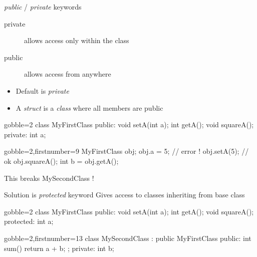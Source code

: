 \begin{frame}[fragile]
  \begin{block}{{\it public} \color{white} / {\it private} keywords}
    \begin{description}
      \item[private] allows access only within the class
      \item[public] allows access from anywhere
    \end{description}
    \begin{itemize}
      \item Default is {\it private}
      \item A {\it struct} is a {\it class} where all members are public
    \end{itemize}
  \end{block}
  \pause
  \begin{multicols}{2}
    \begin{cppcode*}{gobble=2}
      class MyFirstClass {
      public:
        void setA(int a);
        int getA();
        void squareA();
      private:
        int a;
      }
    \end{cppcode*}
    \columnbreak
    \begin{cppcode*}{gobble=2,firstnumber=9}
      MyFirstClass obj;
      obj.a = 5;   // error !
      obj.setA(5); // ok
      obj.squareA();
      int b = obj.getA();
    \end{cppcode*}
    \pause
    \begin{tcolorbox}[left=0mm,right=0mm,top=0mm,bottom=0mm,colback=red!5!white,colframe=red!75!black]
      This breaks MySecondClass !
    \end{tcolorbox}
  \end{multicols}
\end{frame}

\begin{frame}[fragile]
  \begin{block}{Solution is {\it protected} keyword}
    Gives access to classes inheriting from base class
  \end{block}
  \begin{multicols}{2}
    \begin{cppcode*}{gobble=2}
      class MyFirstClass {
      public:
        void setA(int a);
        int getA();
        void squareA();
      protected:
        int a;
      }
    \end{cppcode*}
    \columnbreak
    \begin{cppcode*}{gobble=2,firstnumber=13}
      class MySecondClass :
        public MyFirstClass {
      public:
        int sum() {
          return a + b;
        };
      private:
        int b;
      }
    \end{cppcode*}
  \end{multicols}
\end{frame}


